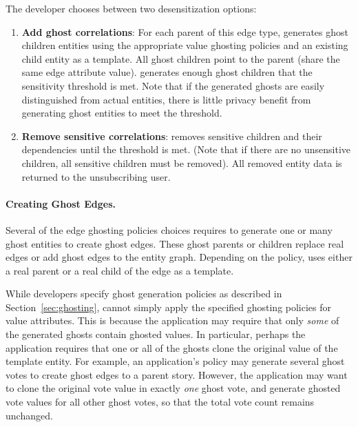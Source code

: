 The developer chooses between two desensitization options:
\begin{enumerate} 
    \item \textbf{Add ghost correlations}: For each parent of this edge type, \sys
            generates ghost children entities using the appropriate value ghosting policies and an
            existing child entity as a template. All ghost children point to the parent (share the
            same edge attribute value).  \sys generates enough ghost children that the sensitivity
            threshold is met.  Note that if the generated ghosts are easily distinguished from
            actual entities, there is little privacy benefit from generating ghost entities to meet
            the threshold.

\item \textbf{Remove sensitive correlations}: \sys removes sensitive children and their dependencies
    until the threshold is met. (Note that if there are no unsensitive children, all sensitive
    children must be removed). All removed entity data is returned to the unsubscribing user.
\end{enumerate}

\paragraph{Creating Ghost Edges.}
Several of the edge ghosting policies choices requires \sys to generate one or many ghost entities
to create ghost edges. These ghost parents or children replace real edges or add ghost edges to the
entity graph.  Depending on the policy, \sys uses either a real parent or a real child of the
edge as a template. 

While developers specify ghost generation policies as described in Section~\ref{sec:ghosting}, \sys
cannot simply apply the specified ghosting policies for value attributes.  This is because the
application may require that only \emph{some} of the generated ghosts contain ghosted values. In
particular, perhaps the application requires that one or all of the ghosts clone the original value
of the template entity. For example, an application's policy may generate several ghost votes to
create ghost edges to a parent story. However, the application may want to clone the original vote
value in exactly \emph{one} ghost vote, and generate ghosted vote values for all other ghost votes,
so that the total vote count remains unchanged. 


